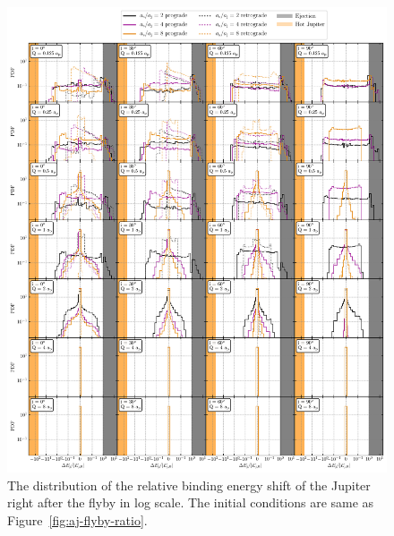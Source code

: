 \documentclass[twocolumn]{aastex63}
\newcommand*\fgr[1]{Figure~\ref{#1}}
\begin{document}
\begin{figure}
    \includegraphics[width=\textwidth]{figs/dEj-flyby-ratio.pdf}
    \caption{The distribution of the relative binding energy shift of the Jupiter right after the flyby in log scale. The initial conditions are same as \fgr{fig:aj-flyby-ratio}.} 
    \label{fig:dEj-flyby-ratio}
\end{figure}
\end{document}

